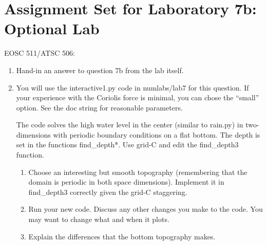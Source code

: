 \documentclass[12pt]{article}
\begin{document}
\section*{Assignment Set for Laboratory 7b: Optional Lab}

EOSC 511/ATSC 506: 

\begin{enumerate}
\item Hand-in an answer to question 7b from the lab itself.

\item You will use the interactive1.py code in numlabs/lab7 for this
  question.  If your experience with the Coriolis force is minimal,
  you can chose the ``small'' option.  See the doc string for
  reasonable parameters.

The code solves the high water level in the center (similar to rain.py)
in two-dimensions with periodic boundary conditions on a flat bottom.
The depth is set in the functions find\_depth*.  Use
grid-C and edit the find\_depth3 function.  
\begin{enumerate}
\item Choose an interesting but smooth topography (remembering that
  the domain is periodic in both space dimensions).  Implement it in
  find\_depth3 correctly given the grid-C staggering.  
\item Run your new code. Discuss any other changes you make to the code. You may want to change what and when it plots.
\item Explain the differences that the bottom topography makes.
\end{enumerate}

\end{enumerate}
\end{document}
